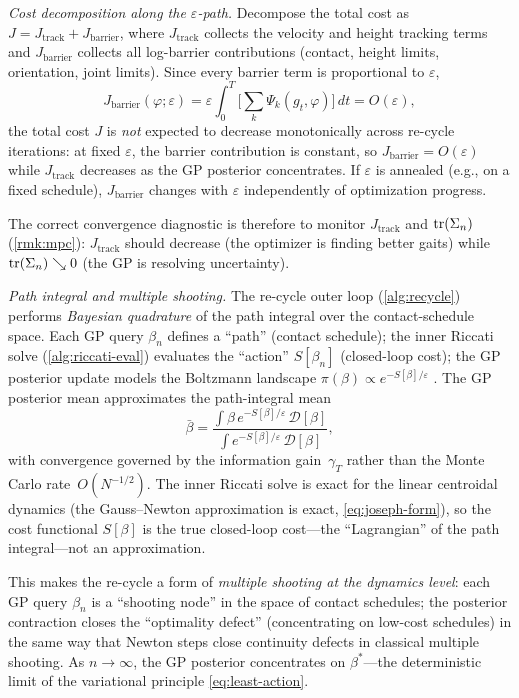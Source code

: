 \medskip\noindent\emph{Cost decomposition along the $\varepsilon$-path.}
Decompose the total cost as $J = J_{\mathrm{track}} + J_{\mathrm{barrier}}$,
where $J_{\mathrm{track}}$ collects the velocity and height tracking terms
and $J_{\mathrm{barrier}}$ collects all log-barrier contributions
(contact, height limits, orientation, joint limits).
Since every barrier term is proportional to $\varepsilon$,
\[
J_{\mathrm{barrier}}(\varphi;\varepsilon)
= \varepsilon \int_0^T \!\bigl[
  \textstyle\sum_k \Psi_k(g_t, \varphi)
\bigr]\,dt
= O(\varepsilon),
\]
the total cost $J$ is \emph{not} expected to decrease monotonically across
re-cycle iterations: at fixed $\varepsilon$, the barrier contribution is
constant, so $J_{\mathrm{barrier}} = O(\varepsilon)$ while
$J_{\mathrm{track}}$ decreases as the GP posterior concentrates.
If $\varepsilon$ is annealed (e.g., on a fixed schedule),
$J_{\mathrm{barrier}}$ changes with $\varepsilon$ independently of
optimization progress.

The correct convergence diagnostic is therefore to monitor
$J_{\mathrm{track}}$ and $\operatorname{tr}(\Sigma_n)$ (\cref{rmk:mpc}):
$J_{\mathrm{track}}$ should decrease (the optimizer is finding
better gaits) while $\operatorname{tr}(\Sigma_n) \searrow 0$ (the GP is
resolving uncertainty).

\medskip\noindent\emph{Path integral and multiple shooting.}
The re-cycle outer loop (\cref{alg:recycle}) performs
\emph{Bayesian quadrature} of the path integral over the
contact-schedule space.
Each GP query $\beta_n$ defines a ``path'' (contact schedule);
the inner Riccati solve (\cref{alg:riccati-eval}) evaluates the
``action'' $S[\beta_n]$ (closed-loop cost); the GP posterior
update models the Boltzmann landscape
$\pi(\beta) \propto e^{-S[\beta]/\varepsilon}$
\cite{WilliamsMPPI}.
The GP posterior mean approximates the path-integral mean
\[
  \bar{\beta}
  = \frac{\int \beta\, e^{-S[\beta]/\varepsilon}\,
    \mathcal{D}[\beta]}
  {\int e^{-S[\beta]/\varepsilon}\, \mathcal{D}[\beta]},
\]
with convergence governed by the information gain~$\gamma_T$
rather than the Monte Carlo rate~$O(N^{-1/2})$.
The inner Riccati solve is exact for the linear centroidal dynamics
(the Gauss--Newton approximation is exact,
\eqref{eq:joseph-form}), so the cost functional $S[\beta]$ is
the true closed-loop cost---the ``Lagrangian'' of the path
integral---not an approximation.

This makes the re-cycle a form of
\emph{multiple shooting at the dynamics level}:
each GP query $\beta_n$ is a ``shooting node'' in the space of
contact schedules; the posterior contraction closes the
``optimality defect'' (concentrating on low-cost schedules)
in the same way that Newton steps close continuity defects in
classical multiple shooting.
As $n \to \infty$, the GP posterior concentrates on
$\beta^*$---the deterministic limit of the variational principle
\eqref{eq:least-action}.


